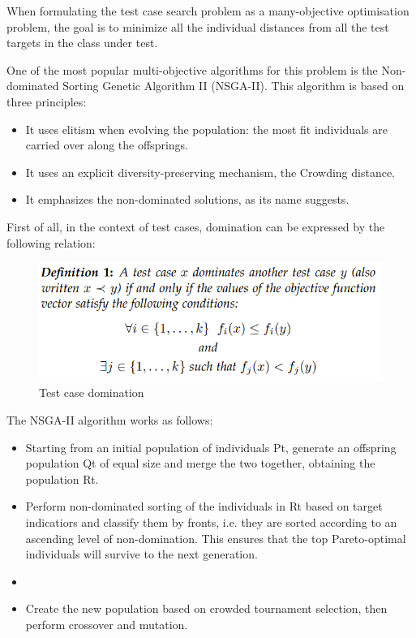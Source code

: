When formulating the test case search problem as a many-objective optimisation problem, the goal is to minimize all the individual
distances from all the test targets in the class under test.

One of the most popular multi-objective algorithms for this problem is the Non-dominated Sorting Genetic Algorithm II (NSGA-II).
This algorithm is based on three principles:
\begin{itemize}
    \item It uses elitism when evolving the population: the most fit individuals are carried over along the offsprings.
    \item It uses an explicit diversity-preserving mechanism, the Crowding distance.
    \item It emphasizes the non-dominated solutions, as its name suggests.
\end{itemize}

First of all, in the context of test cases, domination can be expressed by the following relation:
\begin{figure}[h]
    \centering
    \includegraphics[scale=0.4]{./figures/test_Case_domination.PNG}
    \caption{Test case domination}
    \label{fig:test case domination}
\end{figure}


The NSGA-II algorithm works as follows:
\begin{itemize}
    \item Starting from an initial population of individuals Pt, generate an offspring population Qt of equal size and merge
        the two together, obtaining the population Rt.
    \item Perform non-dominated sorting of the individuals in Rt based on target indicatiors and classify them by fronts,
        i.e. they are sorted according to an ascending level of non-domination. 
        This ensures that the top Pareto-optimal individuals will survive to the next generation.
    \item 
    \item Create the new population based on crowded tournament selection, then perform crossover and mutation.
\end{itemize}


